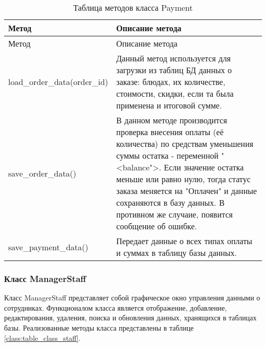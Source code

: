 \begin{xltabular}{\textwidth}{|p{6cm}|X|}
	\caption{Таблица методов класса Payment\label{class:table_class_payment}} \hline
	\centrow Метод & \centrow Описание метода \\ \hline
	\endfirsthead
	\centrow Метод & \centrow Описание метода \\ \hline
	\finishhead
	load\_order\_data(order\_id) & Данный метод используется для загрузки из таблиц БД данных о заказе: блюдах, их количестве, стоимости, скидки, если та была применена и итоговой сумме. \\ \hline
	save\_order\_data() & В данном методе производится проверка внесения оплаты (её количества) по средствам уменьшения суммы остатка - переменной "<balance">. Если значение остатка меньше или равно нулю, тогда статус заказа меняется на "Оплачен" и данные сохраняются в базу данных. В противном же случаие, появится сообщение об ошибке. \\ \hline 
	save\_payment\_data() & Передает данные о всех типах оплаты и суммах в таблицу базы данных.
\end{xltabular}

\subsubsection{Класс ManagerStaff}

Класс ManagerStaff представляет собой графическое окно управления данными о сотрудниках. Функционалом класса является отображение, добавление, редактирования, удаления, поиска и обновления данных, хранящихся в таблицах базы. Реализованные методы класса представлены в таблице  \ref{class:table_class_staff}.

